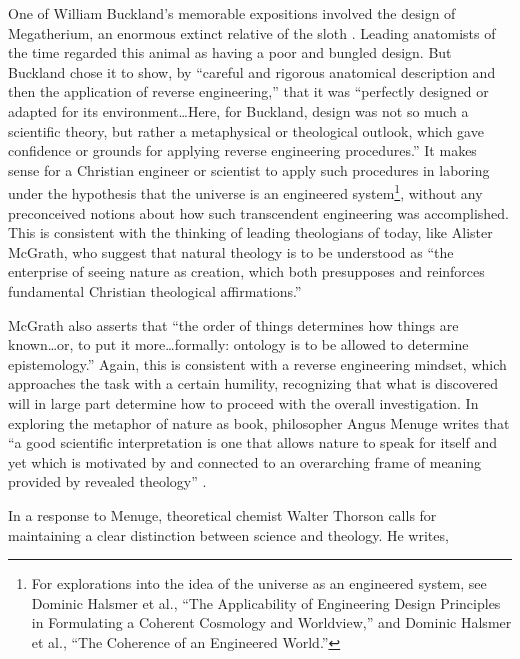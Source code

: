 One of William Buckland’s memorable expositions involved the design of
Megatherium, an enormous extinct relative of the
sloth \citep[][p.~245]{roberts1999}.
Leading anatomists of the time regarded this
animal as having a poor and bungled design. But Buckland chose it to
show, by ``careful and rigorous anatomical description and then the
application of reverse engineering,'' that it was ``perfectly designed or
adapted for its environment{\ldots}Here, for Buckland, design was not so much
a scientific theory, but rather a metaphysical or theological outlook,
which gave confidence or grounds for applying reverse engineering
procedures.''\citep[][p.~248]{roberts1999}
It makes sense for a Christian
engineer or scientist to apply such procedures in laboring under the
hypothesis that the universe is an engineered
system\footnote{
For explorations into the idea of the universe as an
engineered system, see Dominic Halsmer et al., ``The Applicability of
Engineering Design Principles in Formulating a Coherent Cosmology and
Worldview,''\citep{halsmeretal2008} and Dominic Halsmer et al., ``The Coherence of an
Engineered World.''\citep{halsmeretal2009b}
}, without any preconceived notions about how
such transcendent engineering was accomplished. This is consistent with
the thinking of leading theologians of today, like Alister McGrath, who
suggest that natural theology is to be understood as ``the enterprise of
seeing nature as creation, which both presupposes and reinforces
fundamental Christian theological affirmations.''\citep[][p.~64]{mcgrath2006}

McGrath also asserts that ``the order of things determines how things are
known{\ldots}or, to put it more{\ldots}formally: ontology is to be allowed to
determine epistemology.''\citep[][pp. xv--xvi]{mcgrath2006} Again, this is consistent
with a reverse engineering mindset, which approaches the task with a
certain humility, recognizing that what is discovered will in large
part determine how to proceed with the overall investigation. In
exploring the metaphor of nature as book, philosopher Angus Menuge
writes that ``a good scientific interpretation is one that allows nature
to speak for itself and yet which is motivated by and connected to an
overarching frame of meaning provided by revealed
theology'' \citep[][p.~96]{menuge2003}.

In a response to Menuge, theoretical chemist Walter Thorson calls for
maintaining a clear distinction between science and theology. He
writes,

